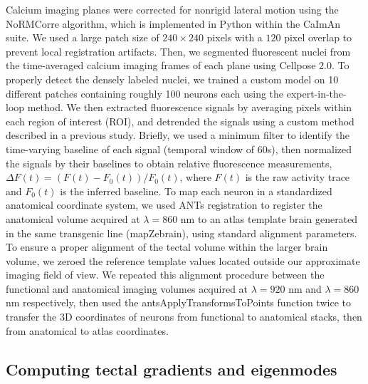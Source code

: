 \documentclass{article}
\begin{document}
Calcium imaging planes were corrected for nonrigid lateral motion using the NoRMCorre algorithm\cite{pnevmatikakis2017normcorre}, which is implemented in Python within the CaImAn suite\cite{giovannucci2019caiman}. We used a large patch size of $240\times240$ pixels with a $120$ pixel overlap to prevent local registration artifacts. Then, we segmented fluorescent nuclei from the time-averaged calcium imaging frames of each plane using Cellpose 2.0\cite{pachitariu2022cellpose}. To properly detect the densely labeled nuclei, we trained a custom model on 10 different patches containing roughly 100 neurons each using the expert-in-the-loop method. We then extracted fluorescence signals by averaging pixels within each region of interest (ROI), and detrended the signals using a custom method described in a previous study\cite{legare2025structural}. Briefly, we used a minimum filter to identify the time-varying baseline of each signal (temporal window of $60$s), then normalized the signals by their baselines to obtain relative fluorescence measurements, $\Delta F(t)=(F(t) - F_0(t))/F_0 (t)$, where $F(t)$ is the raw activity trace and $F_0(t)$ is the inferred baseline. To map each neuron in a standardized anatomical coordinate system, we used ANTs registration\cite{avants2009advanced} to register the anatomical volume acquired at $\lambda=860$ nm to an atlas template brain generated in the same transgenic line (mapZebrain\cite{kunst2019cellular}), using standard alignment parameters\cite{marquart2017high}. To ensure a proper alignment of the tectal volume within the larger brain volume, we zeroed the reference template values located outside our approximate imaging field of view. We repeated this alignment procedure between the functional and anatomical imaging volumes acquired at $\lambda=920$ nm and $\lambda=860$ nm respectively, then used the antsApplyTransformsToPoints function twice to transfer the 3D coordinates of neurons from functional to anatomical stacks, then from anatomical to atlas coordinates. 

\subsection*{Computing tectal gradients and eigenmodes}
\end{document}

